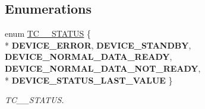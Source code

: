 \subsection*{Enumerations}
\begin{DoxyCompactItemize}
\item 
enum \hyperlink{group__tc74__device__driver_ga5efc26e94b9e9e19bd364c2d8b57f00f}{T\-C\-\_\-\_\-\-S\-T\-A\-T\-U\-S} \{ \\*
{\bfseries D\-E\-V\-I\-C\-E\-\_\-\-E\-R\-R\-O\-R}, 
{\bfseries D\-E\-V\-I\-C\-E\-\_\-\-S\-T\-A\-N\-D\-B\-Y}, 
{\bfseries D\-E\-V\-I\-C\-E\-\_\-\-N\-O\-R\-M\-A\-L\-\_\-\-D\-A\-T\-A\-\_\-\-R\-E\-A\-D\-Y}, 
{\bfseries D\-E\-V\-I\-C\-E\-\_\-\-N\-O\-R\-M\-A\-L\-\_\-\-D\-A\-T\-A\-\_\-\-N\-O\-T\-\_\-\-R\-E\-A\-D\-Y}, 
\\*
{\bfseries D\-E\-V\-I\-C\-E\-\_\-\-S\-T\-A\-T\-U\-S\-\_\-\-L\-A\-S\-T\-\_\-\-V\-A\-L\-U\-E}
 \}
\begin{DoxyCompactList}\small\item\em T\-C\-\_\-\_\-\-S\-T\-A\-T\-U\-S. \end{DoxyCompactList}\end{DoxyCompactItemize}
